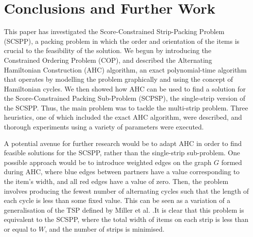 \documentclass[runningheads]{llncs}
\begin{document}
\section{Conclusions and Further Work}
\label{sec:conclusion}
This paper has investigated the Score-Constrained Strip-Packing Problem (SCSPP), a packing problem in which the order and orientation of the items is crucial to the feasibility of the solution. We begun by introducing the Constrained Ordering Problem (COP), and described the Alternating Hamiltonian Construction (AHC) algorithm, an exact polynomial-time algorithm that operates by modelling the problem graphically and using the concept of Hamiltonian cycles. We then showed how AHC can be used to find a solution for the Score-Constrained Packing Sub-Problem (SCPSP), the single-strip version of the SCSPP. Thus, the main problem was to tackle the multi-strip problem. Three heuristics, one of which included the exact AHC algorithm, were described, and thorough experiments using a variety of parameters were executed. 

A potential avenue for further research would be to adapt AHC in order to find feasible solutions for the SCSPP, rather than the single-strip sub-problem. One possible approach would be to introduce weighted edges on the graph $G$ formed during AHC, where blue edges between partners have a value corresponding to the item's width, and all red edges have a value of zero. Then, the problem involves producing the fewest number of alternating cycles such that the length of each cycle is less than some fixed value. This can be seen as a variation of a generalisation of the TSP defined by Miller et al. \cite{miller1960}.It is clear that this problem is equivalent to the SCSPP, where the total width of items on each strip is less than or equal to $W$, and the number of strips is minimised. 
\end{document}

